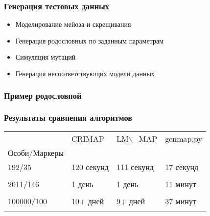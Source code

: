 \documentclass{beamer}
\begin{document}
\begin{frame}
  \frametitle{Генерация тестовых данных}
  \begin{itemize}
    \item Моделирование мейоза и скрещивания
    \item Генерация родословных по заданным параметрам
    \item Симуляция мутаций
    \item Генерация несоответствующих модели данных
  \end{itemize}
\end{frame}

\begin{frame}
  \frametitle{Пример родословной}

\end{frame}

\begin{frame}
  \frametitle{Результаты сравнения алгоритмов}


  \begin{tabular}{|l|l|l|l|}
    \hline
    & CRIMAP & LM$\backslash$\_MAP & genmap.py \\
    Особи/Маркеры & & & \\
    \hline
    192/35 & 120 секунд & 111 секунд & 17 секунд \\
    & & & \\
    \hline
    2011/146 & 1 день & 1 день & 11 минут \\
    & & & \\
    \hline
    100000/100 & 10+ дней & 9+ дней & 37 минут \\
    & & & \\
    \hline
  \end{tabular}


\end{frame}
\end{document}
